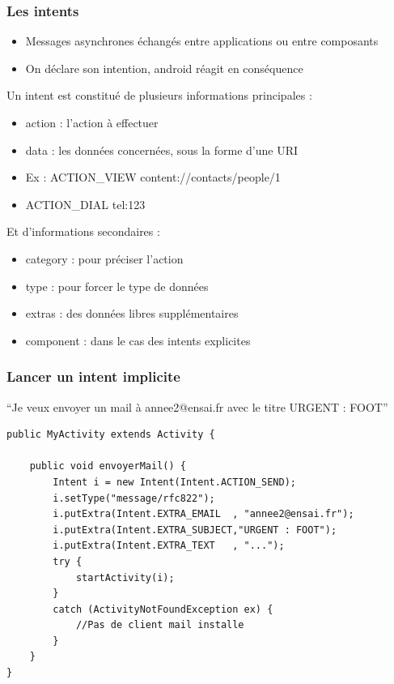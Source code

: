 \documentclass{beamer}
\begin{document}
\begin{frame}[fragile]
\frametitle{Les intents}
\begin{itemize}
 \item Messages asynchrones échangés entre applications ou entre composants
 \item On déclare son intention, android réagit en conséquence
 \end{itemize}
Un intent est constitué de plusieurs informations principales :
\begin{itemize}
 \item action : l'action à effectuer 
 \item data : les données concernées, sous la forme d'une URI
 \item Ex : ACTION\_VIEW content://contacts/people/1
 \item ACTION\_DIAL tel:123
 \end{itemize}
Et d'informations secondaires : 
\begin{itemize}
 \item category : pour préciser l'action
 \item type : pour forcer le type de données 
 \item extras : des données libres supplémentaires
 \item component : dans le cas des intents explicites
 \end{itemize}
\end{frame}
\begin{frame}[fragile]
\frametitle{Lancer un intent implicite}
``Je veux envoyer un mail à annee2@ensai.fr avec le titre URGENT : FOOT''
\begin{lstlisting}
public MyActivity extends Activity {
    
    public void envoyerMail() {
        Intent i = new Intent(Intent.ACTION_SEND);
        i.setType("message/rfc822");
        i.putExtra(Intent.EXTRA_EMAIL  , "annee2@ensai.fr");
        i.putExtra(Intent.EXTRA_SUBJECT,"URGENT : FOOT"); 
        i.putExtra(Intent.EXTRA_TEXT   , "...");
        try {
            startActivity(i);
        } 
        catch (ActivityNotFoundException ex) {
            //Pas de client mail installe
        }
    }	
}
\end{lstlisting}
\end{frame}
\end{document}
